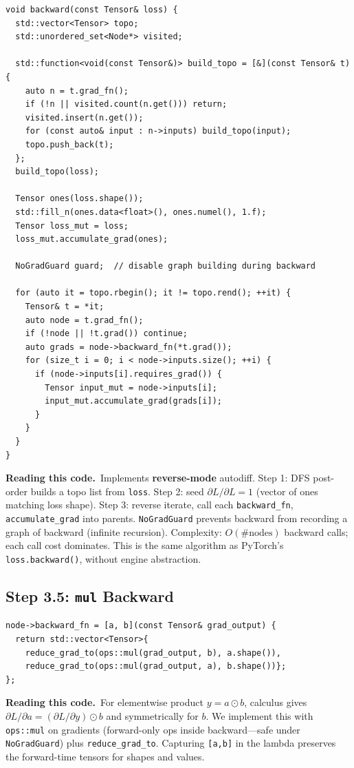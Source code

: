 \documentclass[11pt,a4paper]{article}
\newcommand{\explain}{\par\smallskip\noindent}
\newcommand{\exhead}{\textbf{Reading this code.}\ }
\begin{document}
\begin{lstlisting}[style=cpp]
void backward(const Tensor& loss) {
  std::vector<Tensor> topo;
  std::unordered_set<Node*> visited;

  std::function<void(const Tensor&)> build_topo = [&](const Tensor& t) {
    auto n = t.grad_fn();
    if (!n || visited.count(n.get())) return;
    visited.insert(n.get());
    for (const auto& input : n->inputs) build_topo(input);
    topo.push_back(t);
  };
  build_topo(loss);

  Tensor ones(loss.shape());
  std::fill_n(ones.data<float>(), ones.numel(), 1.f);
  Tensor loss_mut = loss;
  loss_mut.accumulate_grad(ones);

  NoGradGuard guard;  // disable graph building during backward

  for (auto it = topo.rbegin(); it != topo.rend(); ++it) {
    Tensor& t = *it;
    auto node = t.grad_fn();
    if (!node || !t.grad()) continue;
    auto grads = node->backward_fn(*t.grad());
    for (size_t i = 0; i < node->inputs.size(); ++i) {
      if (node->inputs[i].requires_grad()) {
        Tensor input_mut = node->inputs[i];
        input_mut.accumulate_grad(grads[i]);
      }
    }
  }
}
\end{lstlisting}
\explain\exhead Implements \textbf{reverse-mode} autodiff. Step 1: DFS post-order builds a
topo list from \texttt{loss}. Step 2: seed $\partial L/\partial L = 1$ (vector of ones matching
loss shape). Step 3: reverse iterate, call each \texttt{backward\_fn}, \texttt{accumulate\_grad}
into parents. \texttt{NoGradGuard} prevents backward from recording a graph of backward (infinite
recursion). Complexity: $O(\#\text{nodes})$ backward calls; each call cost dominates. This is
the same algorithm as PyTorch's \texttt{loss.backward()}, without engine abstraction.

\subsection{Step 3.5: \texttt{mul} Backward}

\begin{lstlisting}[style=cpp]
node->backward_fn = [a, b](const Tensor& grad_output) {
  return std::vector<Tensor>{
    reduce_grad_to(ops::mul(grad_output, b), a.shape()),
    reduce_grad_to(ops::mul(grad_output, a), b.shape())};
};
\end{lstlisting}
\explain\exhead For elementwise product $y = a \odot b$, calculus gives
$\partial L/\partial a = (\partial L/\partial y) \odot b$ and symmetrically for $b$.
We implement this with \texttt{ops::mul} on gradients (forward-only ops inside backward---safe
under \texttt{NoGradGuard}) plus \texttt{reduce\_grad\_to}. Capturing \texttt{[a,b]} in the
lambda preserves the forward-time tensors for shapes and values.
\end{document}
